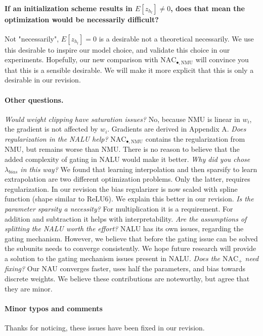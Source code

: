 \documentclass{article}
\begin{document}
\vspace{-0.3cm} \paragraph{If an initialization scheme results in $E[z_{h_l}] \ne 0$, does that mean the optimization would be necessarily difficult?} Not "necessarily", $E[z_{h_l}] = 0$ is a desirable not a theoretical necessarily. We use this desirable to inspire our model choice, and validate this choice in our experiments. Hopefully, our new comparison with $\mathrm{NAC}_{\bullet, \mathrm{NMU}}$ will convince you that this is a sensible desirable. We will make it more explicit that this is only a desirable in our revision. 

\vspace{-0.3cm} \paragraph{Other questions.} \textit{Would weight clipping have saturation issues?} No, because NMU is linear in $w_i$, the gradient is not affected by $w_i$. Gradients are derived in Appendix A. \textit{Does regularization in the NALU help?} $\mathrm{NAC}_{\bullet, \mathrm{NMU}}$ contains the regularization from NMU, but remains worse than NMU. There is no reason to believe that the added complexity of gating in NALU would make it better. \textit{Why did you chose $\lambda_{bias}$ in this way?} We found that learning interpolation and then sparsify to learn extrapolation are two different optimization problems. Only the latter, requires regularization. In our revision the bias regularizer is now scaled with spline function (shape similar to ReLU6). We explain this better in our revision. \textit{Is the parameter sparsity a necessity?} For multiplication it is a requirement. For addition and subtraction it helps with interpretability. \textit{Are the assumptions of splitting the NALU worth the effort?} NALU has its own issues, regarding the gating mechanism. However, we believe that before the gating issue can be solved the subunits needs to converge consistently. We hope future research will provide a solution to the gating mechanism issues present in NALU. \textit{Does the $\mathrm{NAC}_{+}$ need fixing?} Our NAU converges faster, uses half the parameters, and bias towards discrete weights. We believe these contributions are noteworthy, but agree that they are minor.

\vspace{-0.3cm} \paragraph{Minor typos and comments} Thanks for noticing, these issues have been fixed in our revision.
\end{document}
